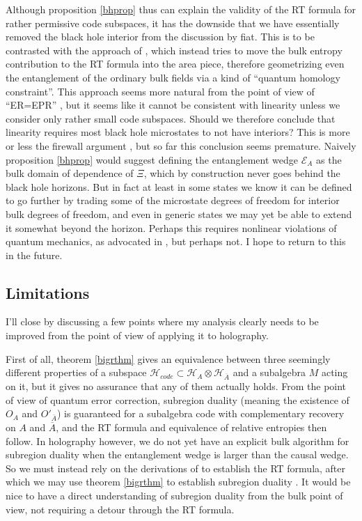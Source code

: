 \documentclass[12pt]{article}
\newcommand{\HA}{\mathcal{H}_A}
\newcommand{\HAb}{\mathcal{H}_{\ol{A}}}
\newcommand{\Ab}{\ol{A}}
\newcommand{\Hc}{\mathcal{H}_{code}}
\newcommand{\ol}{\overline}
\newcommand{\EA}{\mathcal{E}_A}
\begin{document}
Although proposition \ref{bhprop} thus can explain the validity of the RT formula for rather permissive code subspaces, it has the downside that we have essentially removed the black hole interior from the discussion by fiat.  This is to be contrasted with the approach of \cite{Susskind:2014yaa}, which instead tries to move the bulk entropy contribution to the RT formula into the area piece, therefore geometrizing even the entanglement of the ordinary bulk fields via a kind of ``quantum homology constraint''.  This approach seems more natural from the point of view of ``ER=EPR'' \cite{Maldacena:2001kr,Swingle:2009bg,VanRaamsdonk:2010pw,Hartman:2013qma,Maldacena:2013xja}, but it seems like it cannot be consistent with linearity unless we consider only rather small code subspaces.  Should we therefore conclude that linearity requires most black hole microstates to not have interiors?  This is more or less the firewall argument \cite{Almheiri:2012rt,Almheiri:2013hfa,Marolf:2013dba},  but so far this conclusion seems premature.  Naively proposition \ref{bhprop} would suggest defining the entanglement wedge $\EA$ as the bulk domain of dependence of $\Xi$, which by construction never goes behind the black hole horizons.  But in fact at least in some states we know it can be defined to go further by trading some of the microstate degrees of freedom for interior bulk degrees of freedom, and even in generic states we may yet be able to extend it somewhat beyond the horizon.  Perhaps this requires nonlinear violations of quantum mechanics, as advocated in \cite{Papadodimas:2015jra}, but perhaps not.  I hope to return to this in the future. 

\subsection{Limitations}
I'll close by discussing a few points where my analysis clearly needs to be improved from the point of view of applying it to holography.

First of all, theorem \ref{bigrthm} gives an equivalence between three seemingly different properties of a subspace $\Hc\subset \HA\otimes \HAb$ and a subalgebra $M$ acting on it, but it gives no assurance that any of them actually holds.  From the point of view of quantum error correction, subregion duality (meaning the existence of $O_A$ and $O'_{\Ab}$) is guaranteed for a subalgebra code with complementary recovery on $A$ and $\Ab$, and the RT formula and equivalence of relative entropies then follow.  In holography however, we do not yet have an explicit bulk algorithm for subregion duality when the entanglement wedge is larger than the causal wedge.  So we must instead rely on the derivations of \cite{Lewkowycz:2013nqa,Faulkner:2013ana} to establish the RT formula, after which we may use theorem \ref{bigrthm} to establish subregion duality \cite{Dong:2016eik}.  It would be nice to have a direct understanding of subregion duality from the bulk point of view, not requiring a detour through the RT formula.   
\end{document}
